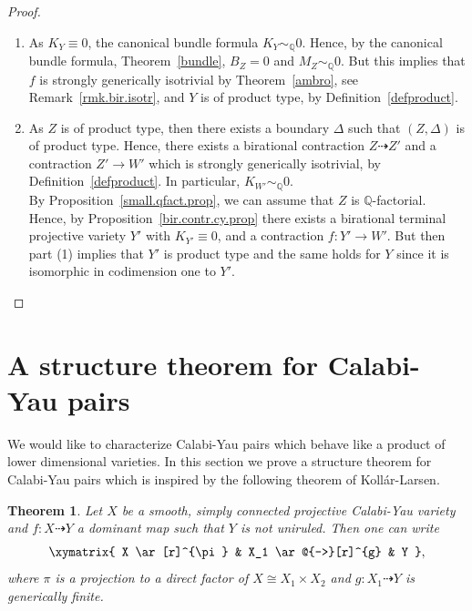 \documentclass{amsart}[12pt,a4paper]
\newtheorem{theorem}{Theorem}[section]
\theoremstyle{definition}
\begin{document}
\begin{proof}
\begin{enumerate}
\item 
As $K_Y\equiv  0$, the canonical bundle formula  $K_Y \sim_\mathbb{Q} 0$.
Hence, by the canonical bundle formula, Theorem~\ref{bundle}, $B_Z=0$ and $M_Z\sim_\mathbb{Q} 0$. 
But this implies that $f$ is strongly generically isotrivial by Theorem~\ref{ambro}, see Remark~\ref{rmk.bir.isotr}, and $Y$ is of product type, by Definition~\ref{defproduct}.

\item
As $Z$ is of product type, then there exists a boundary $\Delta$ such that $(Z, \Delta)$ is of product type.
Hence, there exists a birational contraction $Z \dashrightarrow Z'$ and a contraction $Z' \to W'$ which is strongly generically isotrivial, by Definition~\ref{defproduct}.
In particular, $K_{W'} \sim_\mathbb{Q} 0$.
\\
By Proposition~\ref{small.qfact.prop}, we can assume that $Z$ is $\mathbb{Q}$-factorial. 
Hence, by Proposition~\ref{bir.contr.cy.prop} there exists a birational terminal projective variety $Y'$ with $K_{Y'}\equiv 0$, and a contraction $f \colon Y' \to W'$.
But then part (1) implies that $Y'$ is product type and the same holds for $Y$ since it is isomorphic in codimension one to $Y'$.
\end{enumerate}
\end{proof}


\section{A structure theorem for Calabi-Yau pairs}
\label{CY.pairs.sect}

We would like to characterize Calabi-Yau pairs which behave like a product of lower dimensional varieties. 
In this section we prove a structure theorem for Calabi-Yau pairs which is inspired by the following theorem 
of Koll\'ar-Larsen.

\begin{theorem}\cite[Theorem 3]{KL}
	Let $X$ be a smooth, simply connected projective Calabi-Yau variety and 
	$f \colon X\dashrightarrow Y$ a dominant map such that $Y$ is not uniruled. Then one can write 
	\[
		\xymatrix{
			X \ar[r]^{\pi} & X_1 \ar@{-->}[r]^{g} & Y
		},
	\]
	where $\pi$ is a projection to a direct factor of $X\cong X_1 \times X_2$ and $g\colon X_1 \dashrightarrow Y$ is generically finite.
\end{theorem}
\end{document}
